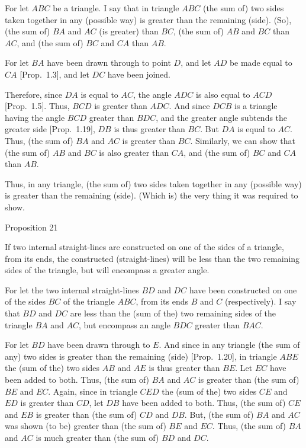 For let $ABC$ be a triangle. I say that in triangle $ABC$ (the sum of) two
sides taken together in
any (possible way) is greater than the remaining (side). (So), (the sum of) $BA$ and $AC$ (is greater) than $BC$,
(the sum of) $AB$ and $BC$ than $AC$, and (the sum of) $BC$ and $CA$ than $AB$.

For let $BA$ have been drawn through to point $D$, and let $AD$ be made equal to $CA$ [Prop.~1.3], and let $DC$ have been joined.

Therefore, since $DA$ is equal to $AC$, the angle $ADC$ is also equal to
$ACD$ [Prop.~1.5]. Thus, $BCD$ is greater than $ADC$. And since
 $DCB$ is a triangle having the angle $BCD$ greater than $BDC$, and the
greater angle subtends the greater side [Prop.~1.19], $DB$ is thus
greater than $BC$. But $DA$ is equal to $AC$. Thus, (the sum of) $BA$ and $AC$ is
greater than $BC$. Similarly, we can show that (the sum of) $AB$ and $BC$ is also
greater than $CA$, and (the sum of) $BC$ and $CA$ than $AB$.

Thus, in any triangle, (the sum of) two sides taken together in any (possible way) is greater than the remaining (side). (Which is) the very thing
it was required to show.


\begin{center}
{\large Proposition 21}
\end{center}

If two internal straight-lines are constructed on one of the sides
of a triangle, from its ends, 
the constructed (straight-lines) will be less than the two remaining 
sides of the triangle, but will encompass a greater angle.

\epsfysize=1.5in
\centerline{}

For let the two internal straight-lines $BD$ and $DC$ have been constructed on one of the sides $BC$ of the triangle $ABC$, from its ends $B$ and $C$ (respectively). I say that 
$BD$ and $DC$ are less than the (sum of the) two  remaining sides of the triangle
$BA$ and $AC$, but encompass an angle $BDC$ greater than $BAC$.

For let $BD$ have been drawn through to $E$. And since in any
triangle (the sum of any) two sides is greater than the remaining (side) [Prop.~1.20],
 in triangle $ABE$ the  (sum of the) two sides $AB$ and $AE$ is thus  greater than
$BE$. Let $EC$ have been added to both. Thus, (the sum of) $BA$ and $AC$ is greater
than (the sum of) $BE$ and $EC$.  Again, since in triangle $CED$ the (sum of the) two sides $CE$ and $ED$
is  greater than $CD$, let $DB$ have been added to both. Thus, 
(the sum of) $CE$ and $EB$ is greater than  (the sum of) $CD$ and $DB$. But, (the sum of) $BA$ and $AC$ was shown
(to be) greater than (the sum of) $BE$
 and $EC$. Thus, (the sum of) $BA$ and $AC$ is much greater than
(the sum of) $BD$ and $DC$.

